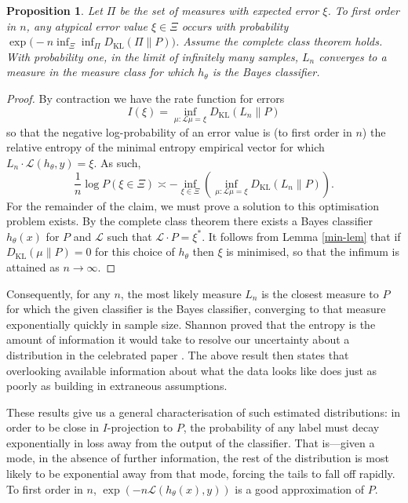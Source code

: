 \documentclass[11pt]{amsart}
\numberwithin{equation}{section}
\newtheorem{prop}{Proposition}[section]
\theoremstyle{remark}
\theoremstyle{remark}
\newcommand{\lag}{\mathcal{L}}
\begin{document}
\begin{prop}\label{contraction-prop}
    Let $\Pi$ be the set of measures with expected error $\xi$. To first order in $n$, any atypical error value $\xi \in \Xi$ occurs with probability $\exp\big(-n \inf_\Xi \inf_\Pi D_{\mathrm{KL}}(\Pi \| P)\big)$. Assume the complete class theorem holds. With probability one, in the limit of infinitely many samples, $L_n$ converges to a measure in the measure class for which $h_\theta$ is the Bayes classifier. 
\end{prop}
\begin{proof}
    By contraction we have the rate function for errors
    \[
        I(\xi) = \inf_{\mu : \lag\mu = \xi} D_{\mathrm{KL}}(L_n \| P)
    \]
    so that the negative log-probability of an error value is (to first order in $n$) the relative entropy of the minimal entropy empirical vector for which $L_n \cdot \lag(h_\theta, y) = \xi$. As such, 
    \[
        \frac{1}{n} \log P(\xi \in \Xi) \asymp - \inf_{\xi \in \Xi}\left( \inf_{\mu : \lag\mu = \xi} D_{\mathrm{KL}}(L_n \| P)\right).
    \]
    For the remainder of the claim, we must prove a solution to this optimisation problem exists. By the complete class theorem there exists a Bayes classifier $h_\theta(x)$ for $P$ and $\lag$ such that $\lag \cdot P = \xi^*$. It follows from Lemma \ref{min-lem} that if $D_{\mathrm{KL}}(\mu \| P) = 0$ for this choice of $h_\theta$ then $\xi$ is minimised, so that the infimum is attained as $n\to\infty$.
\end{proof}

Consequently, for any $n$, the most likely measure $L_n$ is the closest measure to $P$ for which the given classifier is the Bayes classifier, converging to that measure exponentially quickly in sample size. Shannon proved that the entropy is the amount of information it would take to resolve our uncertainty about a distribution in the celebrated paper \cite{shannon}. The above result then states that overlooking available information about what the data looks like does just as poorly as building in extraneous assumptions.

These results give us a general characterisation of such estimated distributions: in order to be close in $I$-projection to $P$, the probability of any label must decay exponentially in loss away from the output of the classifier. That is---given a mode, in the absence of further information, the rest of the distribution is most likely to be exponential away from that mode, forcing the tails to fall off rapidly. To first order in $n$, $\exp(-n\lag(h_\theta(x), y))$ is a good approximation of $P$.
\end{document}
